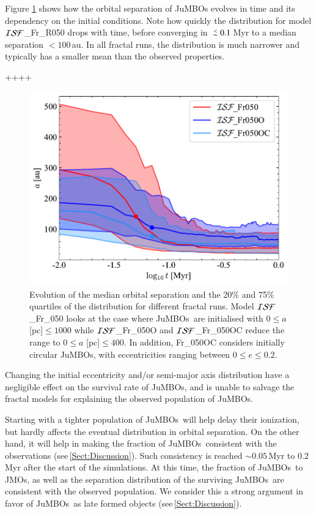 \documentclass[submission,phys]{lib/SciPost}
\def\aplt{\ {\raise-.5ex\hbox{$\buildrel<\over\sim$}}\ }
\newcommand{\jumbos}{\mbox{JuMBOs}}
\begin{document}
Figure \ref{Fig:sma_vs_time_model_ISF_Fr} shows how the orbital separation 
of JuMBOs evolves in time and its dependency on the initial conditions. 
Note how quickly the distribution for model ${\cal
  ISF}$\_Fr\_R050 drops with time, before converging in $\aplt
0.1$\,Myr to a median separation $<100$\,au.  In all fractal runs, the
distribution is much narrower and typically has a smaller mean than the 
observed properties.

++++
\begin{figure}
  \centering
        \includegraphics[width=0.75\columnwidth]{figures/Fractal_GenObs_sem_evol.pdf}
        \caption{Evolution of the median orbital separation and the
          20\% and 75\% quartiles of the distribution for different
          fractal runs.  Model ${\cal ISF}$\_Fr\_050 looks at the case
          where \jumbos\ are initialised with $0\leq a$ [pc]$\leq
          1000$ while ${\cal ISF}$\_Fr\_050O and ${\cal
            ISF}$\_Fr\_050OC reduce the range to $0\leq a$ [pc]$\leq
          400$. In addition, Fr\_050OC considers initially circular
          JuMBOs, with eccentricities ranging between $0\leq e\leq
          0.2$. }
        \label{Fig:sma_vs_time_model_ISF_Fr}
\end{figure}

Changing the initial eccentricity and/or semi-major axis distribution have a 
negligible effect on the survival rate of JuMBOs, and is unable to salvage 
the fractal models for explaining the observed population of \jumbos.  

Starting with a tighter population of \jumbos\, will help delay their
ionization, but hardly affects the eventual distribution in orbital
separation.  On the other hand, it will help in making the fraction of
\jumbos\, consistent with the observations
(see\,\ref{Sect:Discussion}). Such consistency is reached $\sim
0.05$\,Myr to $0.2$\,Myr after the start of the simulations.  At this
time, the fraction of \jumbos\, to JMOs, as well as the separation
distribution of the surviving \jumbos\, are consistent with the
observed population. We consider this a strong argument in favor of
\jumbos\, as late formed objects (see\,\ref{Sect:Discussion}).
\end{document}
